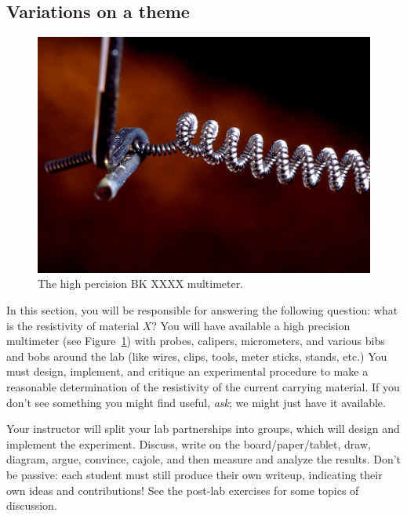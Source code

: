 \documentclass[12pt]{article}
\begin{document}
\subsection{Variations on a theme}
\label{sec:variations}

\begin{figure}
  \centering
  \includegraphics[width=\textwidth/2]{figures/filament}
  \caption{The high percision BK XXXX multimeter.}
  \label{fig:multimeter}
\end{figure}
In this section, you will be responsible for answering the following
question: what is the resistivity of material $X$?  You will have
available a high precision multimeter (see
Figure~\ref{fig:multimeter}) with probes, calipers, micrometers, and
various bibs and bobs around the lab (like wires, clips, tools, meter
sticks, stands, etc.)  You must design, implement, and critique an
experimental procedure to make a reasonable determination of the
resistivity of the current carrying material.  If you don't see
something you might find useful, \textit{ask}; we might just have it
available.

Your instructor will split your lab partnerships into groups, which
will design and implement the experiment.  Discuss, write on the
board/paper/tablet, draw, diagram, argue, convince, cajole, and then
measure and analyze the results.  Don't be passive: each student must
still produce their own writeup, indicating their own ideas and
contributions!  See the post-lab exercises for some topics of
discussion.
\end{document}
